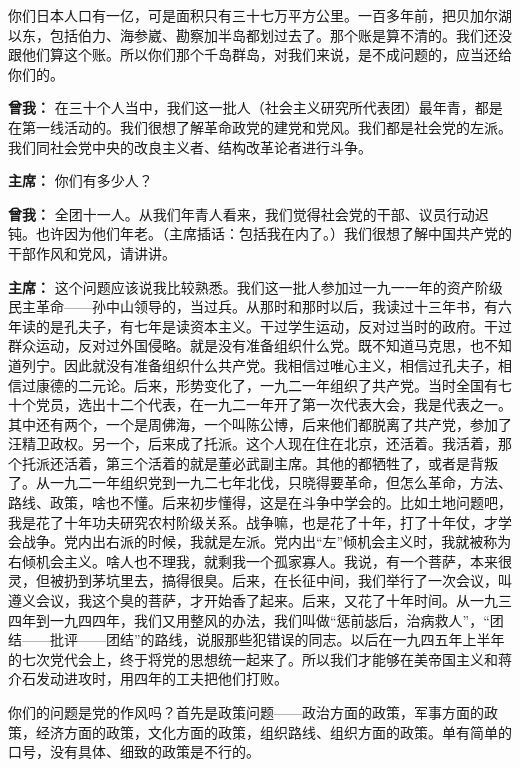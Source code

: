 \begin{duihua}
你们日本人口有一亿，可是面积只有三十七万平方公里。一百多年前，把贝加尔湖以东，包括伯力、海参崴、勘察加半岛都划过去了。那个账是算不清的。我们还没跟他们算这个账。所以你们那个千岛群岛，对我们来说，是不成问题的，应当还给你们的。

\item[\textbf{曾我：}] 在三十个人当中，我们这一批人（社会主义研究所代表团）最年青，都是在第一线活动的。我们很想了解革命政党的建党和党风。我们都是社会党的左派。我们同社会党中央的改良主义者、结构改革论者进行斗争。

\item[\textbf{主席：}] 你们有多少人？

\item[\textbf{曾我：}] 全团十一人。从我们年青人看来，我们觉得社会党的干部、议员行动迟钝。也许因为他们年老。（主席插话：包括我在内了。）我们很想了解中国共产党的干部作风和党风，请讲讲。

\item[\textbf{主席：}] 这个问题应该说我比较熟悉。我们这一批人参加过一九一一年的资产阶级民主革命——孙中山领导的，当过兵。从那时和那时以后，我读过十三年书，有六年读的是孔夫子，有七年是读资本主义。干过学生运动，反对过当时的政府。干过群众运动，反对过外国侵略。就是没有准备组织什么党。既不知道马克思，也不知道列宁。因此就没有准备组织什么共产党。我相信过唯心主义，相信过孔夫子，相信过康德的二元论。后来，形势变化了，一九二一年组织了共产党。当时全国有七十个党员，选出十二个代表，在一九二一年开了第一次代表大会，我是代表之一。其中还有两个，一个是周佛海，一个叫陈公博，后来他们都脱离了共产党，参加了汪精卫政权。另一个，后来成了托派。这个人现在住在北京，还活着。我活着，那个托派还活着，第三个活着的就是董必武副主席。其他的都牺牲了，或者是背叛了。从一九二一年组织党到一九二七年北伐，只晓得要革命，但怎么革命，方法、路线、政策，啥也不懂。后来初步懂得，这是在斗争中学会的。比如土地问题吧，我是花了十年功夫研究农村阶级关系。战争嘛，也是花了十年，打了十年仗，才学会战争。党内出右派的时候，我就是左派。党内出“左”倾机会主义时，我就被称为右倾机会主义。啥人也不理我，就剩我一个孤家寡人。我说，有一个菩萨，本来很灵，但被扔到茅坑里去，搞得很臭。后来，在长征中间，我们举行了一次会议，叫遵义会议，我这个臭的菩萨，才开始香了起来。后来，又花了十年时间。从一九三四年到一九四四年，我们又用整风的办法，我们叫做“惩前毖后，治病救人”，“团结——批评——团结”的路线，说服那些犯错误的同志。以后在一九四五年上半年的七次党代会上，终于将党的思想统一起来了。所以我们才能够在美帝国主义和蒋介石发动进攻时，用四年的工夫把他们打败。

你们的问题是党的作风吗？首先是政策问题——政治方面的政策，军事方面的政策，经济方面的政策，文化方面的政策，组织路线、组织方面的政策。单有简单的口号，没有具体、细致的政策是不行的。


\end{duihua}
